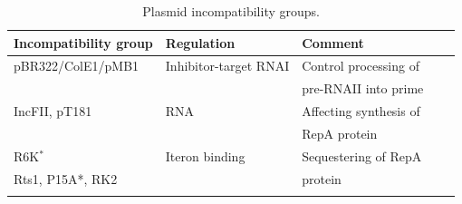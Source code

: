 \begin{table}[ht]
\caption{Plasmid incompatibility groups.\\}
\label{table:13}%
{%
\begin{tabular*}{\columnwidth}{@{}lllll@{}}
\hline
\textbf{Incompatibility group} & \textbf{Regulation} & \textbf{Comment} \\
\hline
pBR322/ColE1/pMB1 & Inhibitor-target RNAI & Control processing of \\
& &  pre-RNAII into prime \\
IncFII, pT181 & RNA & Affecting synthesis of\\
 &  &  RepA protein \\
R6K$^*$ & Iteron binding & Sequestering of RepA \\
Rts1, P15A*, RK2 &  & protein\\
\\
\hline
\hline
\end{tabular*}
}
\\
{
}
\end{table}





